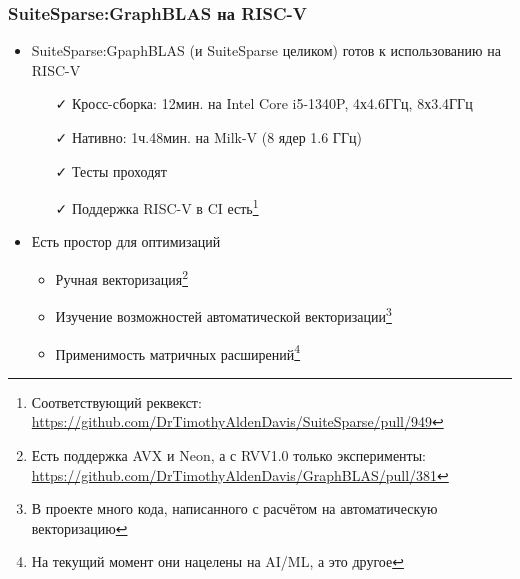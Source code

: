 \documentclass[xcolor=table,aspectratio=169]{beamer}
\begin{document}
\begin{frame}[fragile]
  \frametitle{SuiteSparse:GraphBLAS на RISC-V}
  \begin{itemize}
      \item SuiteSparse:GpaphBLAS (и SuiteSparse целиком) готов к использованию на RISC-V
    \begin{itemize}
      \item[\faCheck] Кросс-сборка: 12мин. на Intel Core i5-1340P, 4х4.6ГГц, 8х3.4ГГц
      \item[\faCheck] Нативно: 1ч.48мин. на Milk-V (8 ядер 1.6 ГГц)
      \item[\faCheck] Тесты проходят
      \item[\faCheck] Поддержка RISC-V в CI есть\footnote{Соответствующий реквекст: \url{https://github.com/DrTimothyAldenDavis/SuiteSparse/pull/949}}
    \end{itemize}
    \vfill
    \item Есть простор для оптимизаций
    \begin{itemize}
      \item Ручная векторизация\footnote{Есть поддержка AVX и Neon, а с RVV1.0 только эксперименты: \url{https://github.com/DrTimothyAldenDavis/GraphBLAS/pull/381}}
      \item Изучение возможностей автоматической векторизации\footnote{В проекте много кода, написанного с расчётом на автоматическую векторизацию}
      \item Применимость матричных расширений\footnote{На текущий момент они нацелены на AI/ML, а это другое}
    \end{itemize}  
  \end{itemize}
\end{frame}
\end{document}
